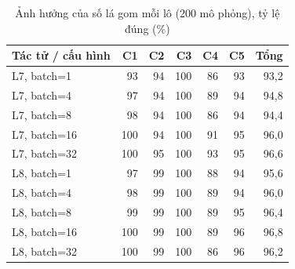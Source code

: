 \begin{table}[H]
  \centering
  \small
  \caption{Ảnh hưởng của số lá gom mỗi lô (200 mô phỏng), tỷ lệ đúng (\%)}
  \label{tab:cs-ct-batch}
  \begin{tabular}{lrrrrrr}
    \toprule
    Tác tử / cấu hình & C1 & C2 & C3 & C4 & C5 & Tổng \\
    \midrule
    L7, batch=1 & 93 & 94 & 100 & 86 & 93 & 93,2 \\
    L7, batch=4 & 97 & 94 & 100 & 89 & 94 & 94,8 \\
    L7, batch=8 & 98 & 94 & 100 & 86 & 94 & 94,4 \\
    L7, batch=16 & 100 & 94 & 100 & 91 & 95 & 96,0 \\
    L7, batch=32 & 100 & 95 & 100 & 93 & 95 & 96,6 \\
    L8, batch=1 & 97 & 99 & 100 & 88 & 94 & 95,6 \\
    L8, batch=4 & 98 & 99 & 100 & 89 & 94 & 96,0 \\
    L8, batch=8 & 99 & 99 & 100 & 89 & 95 & 96,4 \\
    L8, batch=16 & 100 & 99 & 100 & 89 & 96 & 96,8 \\
    L8, batch=32 & 100 & 99 & 100 & 86 & 96 & 96,2 \\
    \bottomrule
  \end{tabular}
\end{table}
